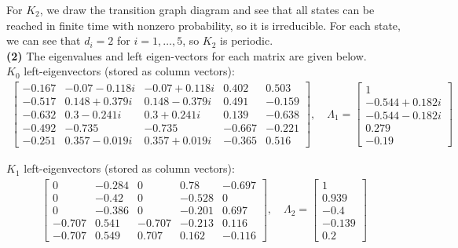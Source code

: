 \documentclass[5pt]{article}
\begin{document}
For $K_2$, we draw the transition graph diagram and see that all states can be reached in finite time with nonzero probability, so it is irreducible. For each state, we can see that $d_i = 2$ for $i = 1, \ldots, 5$, so $K_2$ is periodic. \\

\textbf{(2)} The eigenvalues and left eigen-vectors for each matrix are given below. \\

$K_0$ left-eigenvectors (stored as column vectors):
\begin{align*}
	\begin{bmatrix}
		-0.167	&-0.07-0.118i   &-0.07+0.118i &	  0.402	  &0.503 \\
		-0.517	& 0.148+0.379i	&0.148-0.379i &	  0.491	 &-0.159 \\
		-0.632	& 0.3-0.241i	    &0.3+0.241i	  & 0.139	 &-0.638 \\
		-0.492	&-0.735	        &-0.735	      & -0.667 	 &-0.221 \\
		-0.251	& 0.357-0.019i	&0.357+0.019i &	 -0.365	 & 0.516
	\end{bmatrix}, \quad \Lambda_1 = 
	\begin{bmatrix}
		1	\\
		-0.544+0.182i	\\
		-0.544-0.182i	\\
		0.279	\\
		-0.19
	\end{bmatrix}
\end{align*}

$K_1$ left-eigenvectors (stored as column vectors):
\begin{align*}
	\begin{bmatrix}
		0		&	-0.284	&	0		&	0.78		&	-0.697 \\
		0		&	-0.42	&	0		&	-0.528	&	0\\
		0		&	-0.386	&	0		&	-0.201	&	0.697\\
		-0.707	&	0.541	&	-0.707	&	-0.213	&	0.116 \\
		-0.707	&	0.549	&	0.707	&	0.162	&	-0.116
	\end{bmatrix}, \quad \Lambda_2 = 
	\begin{bmatrix}
		1	\\
		0.939	\\
		-0.4	\\
		-0.139	\\
		0.2	
	\end{bmatrix}
\end{align*}
\end{document}
